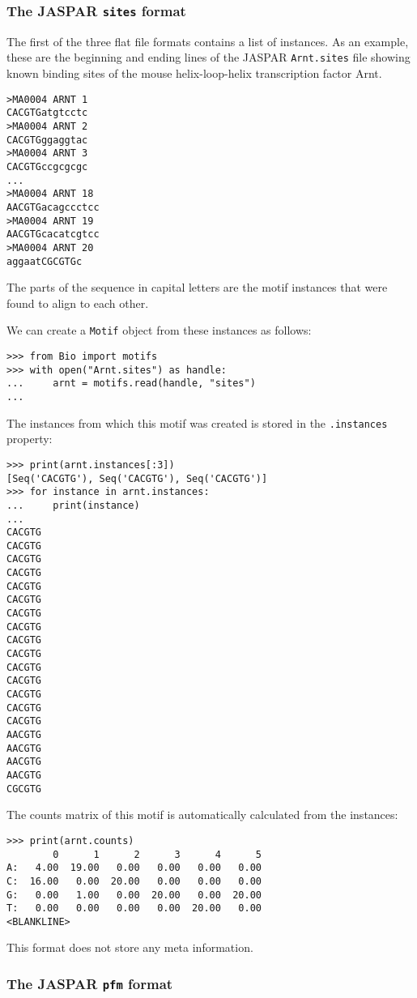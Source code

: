 \subsubsection*{The JASPAR \texttt{sites} format}

The first of the three flat file formats contains a list of instances. As an example, these are the beginning and ending lines of the JASPAR \verb+Arnt.sites+ file showing known binding sites of the mouse helix-loop-helix transcription factor Arnt.
\begin{verbatim}
>MA0004 ARNT 1
CACGTGatgtcctc
>MA0004 ARNT 2
CACGTGggaggtac
>MA0004 ARNT 3
CACGTGccgcgcgc
...
>MA0004 ARNT 18
AACGTGacagccctcc
>MA0004 ARNT 19
AACGTGcacatcgtcc
>MA0004 ARNT 20
aggaatCGCGTGc
\end{verbatim}
The parts of the sequence in capital letters are the motif instances that were found to align to each other.

We can create a \verb+Motif+ object from these instances as follows:
\begin{verbatim}
>>> from Bio import motifs
>>> with open("Arnt.sites") as handle:
...     arnt = motifs.read(handle, "sites")
...
\end{verbatim}
The instances from which this motif was created is stored in the \verb+.instances+ property:
\begin{verbatim}
>>> print(arnt.instances[:3])
[Seq('CACGTG'), Seq('CACGTG'), Seq('CACGTG')]
>>> for instance in arnt.instances:
...     print(instance)
...
CACGTG
CACGTG
CACGTG
CACGTG
CACGTG
CACGTG
CACGTG
CACGTG
CACGTG
CACGTG
CACGTG
CACGTG
CACGTG
CACGTG
CACGTG
AACGTG
AACGTG
AACGTG
AACGTG
CGCGTG
\end{verbatim}
The counts matrix of this motif is automatically calculated from the instances:
\begin{verbatim}
>>> print(arnt.counts)
        0      1      2      3      4      5
A:   4.00  19.00   0.00   0.00   0.00   0.00
C:  16.00   0.00  20.00   0.00   0.00   0.00
G:   0.00   1.00   0.00  20.00   0.00  20.00
T:   0.00   0.00   0.00   0.00  20.00   0.00
<BLANKLINE>
\end{verbatim}
This format does not store any meta information.

\subsubsection*{The JASPAR \texttt{pfm} format}

